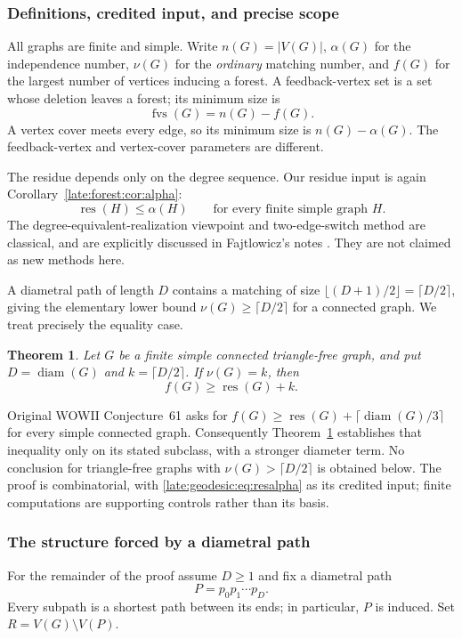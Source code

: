 \documentclass[11pt,a4paper]{article}
\newtheorem{theorem}{Theorem}[section]
\theoremstyle{definition}\newtheorem{definition}[theorem]{Definition}
\theoremstyle{remark}\newtheorem{remark}[theorem]{Remark}
\newcommand{\res}{\operatorname{res}}
\newcommand{\diam}{\operatorname{diam}}
\begin{document}
\subsubsection{Definitions, credited input, and precise scope}
All graphs are finite and simple. Write $n(G)=|V(G)|$, $\alpha(G)$ for the
independence number, $\nu(G)$ for the \emph{ordinary} matching number,
and $f(G)$ for the largest number of vertices inducing a forest. A
feedback-vertex set is a set whose deletion leaves a forest; its minimum
size is
\[
 \operatorname{fvs}(G)=n(G)-f(G).
\]
A vertex cover meets every edge, so its minimum size is $n(G)-\alpha(G)$.
The feedback-vertex and vertex-cover parameters are different.

The residue depends only on the degree sequence. Our residue input is
again Corollary~\ref{late:forest:cor:alpha}:
\begin{equation}\label{late:geodesic:eq:resalpha}
 \res(H)\le\alpha(H)\qquad\text{for every finite simple graph }H.
\end{equation}
The degree-equivalent-realization viewpoint and two-edge-switch method
are classical, and are explicitly discussed in Fajtlowicz's notes
\cite[p.~37]{late:apex:Fajtlowicz}. They are not claimed as new methods here.

A diametral path of length $D$ contains a matching of size
$\lfloor(D+1)/2\rfloor=\lceil D/2\rceil$, giving the elementary lower
bound $\nu(G)\ge\lceil D/2\rceil$ for a connected graph. We treat precisely
the equality case.
\begin{theorem}\label{late:geodesic:thm:main}
Let $G$ be a finite simple connected triangle-free graph, and put
$D=\diam(G)$ and $k=\lceil D/2\rceil$. If $\nu(G)=k$, then
\begin{equation}\label{late:geodesic:eq:main}
 f(G)\ge\res(G)+k.
\end{equation}
\end{theorem}
Original WOWII Conjecture~61 asks for
$f(G)\ge\res(G)+\lceil\diam(G)/3\rceil$ for every simple connected graph.
Consequently Theorem~\ref{late:geodesic:thm:main} establishes that inequality only on its
stated subclass, with a stronger diameter term. No conclusion for
triangle-free graphs with $\nu(G)>\lceil D/2\rceil$ is obtained below.
The proof is combinatorial, with \eqref{late:geodesic:eq:resalpha} as its credited input;
finite computations are supporting controls rather than its basis.

\subsubsection{The structure forced by a diametral path}
For the remainder of the proof assume $D\ge1$ and fix a diametral path
\[
 P=p_0p_1\cdots p_D.
\]
Every subpath is a shortest path between its ends; in particular, $P$ is
induced. Set $R=V(G)\setminus V(P)$.
\end{document}
